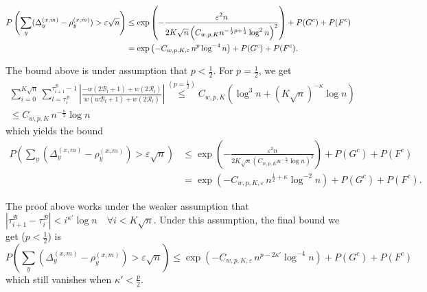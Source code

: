 \begin{align}
	P\left( \sum_y (\Delta_y^{(x,m)} - \rho_y^{(x,m)}) > \varepsilon \sqrt{n}  \right) \notag
	&\le \exp\left( - \frac{\varepsilon^2 n}{2 K \sqrt{n} \left( C_{w, p, K} n^{-\frac{1}{2}p + \frac{1}{4}} \log^2 n  \right)^2 } \right) + P(G^c) + P(F^c) \notag \\
	&= \exp\left( - C_{w, p, K, \varepsilon} \, n^{p } \log^{-4} n \right) +P(G^c) + P(F^c) \label{eqn:drift-martingale}
.\end{align}

\begin{remark}
	The bound above is under assumption that  $p < \frac{1}{2}$. For $p = \frac{1}{2}$, we get
	\begin{multline}
		\sum_{i = 0}^{K \sqrt{n} } 
		\sum_{l = \tau_i^{\mathcal{B}}} ^{\tau_{i+1}^{\mathcal{B}}  -1}
		\left|\frac{-w(2 \mathcal{B}_l + 1) + w(2 \mathcal{R}_l)}{w(w\mathcal{B}_l + 1) + w(2 \mathcal{R}_l)}\right| 
	\stackrel{(p=\frac{1}{2})}{\le } C_{w, p, K} \left(
	\log^3 n + (K \sqrt{ n} )^{- \kappa } \log n \right)  
	\\
	\le C_{w, p, K} \, n^{- \frac{\kappa}{2}} \log n
	\end{multline} 
	which yields the bound
\begin{align*}
	P\left( \sum_y (\Delta_y^{(x,m)} - \rho_y^{(x,m)}) > \varepsilon \sqrt{n}  \right) 
	&\le \exp\left( - \frac{\varepsilon^2 n}{2 K \sqrt{n} \left( C_{w, p, K} n^{-\frac{\kappa}{2}} \log n  \right)^2 } \right) + P(G^c) + P(F^c)\\
	&= \exp\left( - C_{w, p, K, \varepsilon} \, n^{\frac{1}{2} + \kappa } \log^{-2} n \right) +P(G^c) + P(F^c)
.\end{align*}
\end{remark}

\begin{remark}
	The proof above works under the weaker assumption that  $\left| \tau_{i+1}^{\mathcal{B}} - \tau_i^{\mathcal{B}} \right| < i^{\kappa'} \log n \quad \forall i < K \sqrt{n} 
.$
Under this assumption, the final bound we get ($p<\frac{1}{2}$) is 
\[
	P\left( \sum_y (\Delta_y^{(x,m)} - \rho_y^{(x,m)}) > \varepsilon \sqrt{n}  \right) 
	\le \exp\left( - C_{w, p, K, \varepsilon} \, n^{p - 2 \kappa'} \log^{-4} n \right) +P(G^c) + P(F^c)
\] 
	which still vanishes when $\kappa' < \frac{p}{2}$.
\end{remark}
